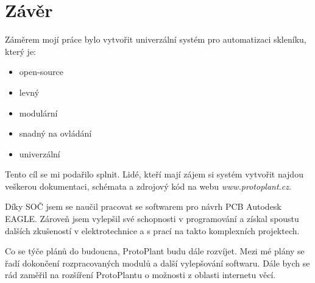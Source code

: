 \chapter*{Závěr}

Záměrem mojí práce bylo vytvořit univerzální systém pro automatizaci skleníku, který je:
\begin{itemize}
    \item open-source
    \item levný
    \item modulární
    \item snadný na ovládání
    \item univerzální
\end{itemize}

Tento cíl se mi podařilo splnit.
Lidé, kteří mají zájem si systém vytvořit najdou veškerou dokumentaci, schémata a zdrojový kód na webu \textit{www.protoplant.cz}.

Díky SOČ jsem se naučil pracovat se softwarem pro návrh PCB Autodesk EAGLE.
Zároveň jsem vylepšil své schopnosti v programování a získal spoustu dalších zkušeností v elektrotechnice a s prací na takto komplexních projektech.

Co se týče plánů do budoucna, ProtoPlant budu dále rozvíjet.
Mezi mé plány se řadí dokončení rozpracovaných modulů a další vylepšování softwaru.
Dále bych se rád zaměřil na rozšíření ProtoPlantu o možnosti z oblasti internetu věcí.

\newpage
